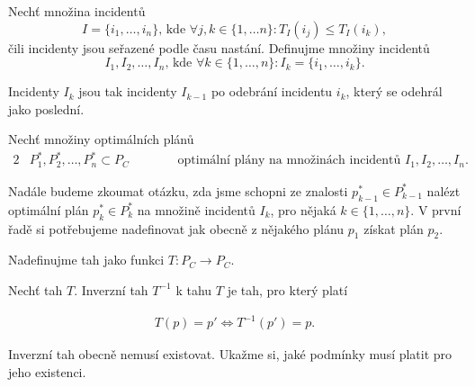 \begin{definice}\label{df:INC}
  Nechť množina incidentů 
  \begin{equation*}
    I = \{ i_1, \dots , i_n \} \text{, kde } \forall j, k \in \{ 1, \dots n\} \colon T_I(i_j) \leq T_I(i_k),
  \end{equation*}
  čili incidenty jsou seřazené podle času nastání.
  Definujme množiny incidentů
  \begin{equation*}
    I_1, I_2, \dots, I_n \text{, kde } \forall k \in \{ 1, \dots, n \} \colon I_k = \{ i_1, \dots, i_k \}.
  \end{equation*}

  Incidenty $I_k$ jsou tak incidenty $I_{k-1}$ po odebrání incidentu $i_k$, který se odehrál jako poslední.
\end{definice}

\begin{definice}
  Nechť množiny optimálních plánů
  \begin{alignat}{2}
    & P^*_{1}, P^*_2, \dots, P^*_{n} \subset P_C \quad && \hspace{15pt} \text{optimální plány na množinách incidentů $I_{1}, I_2, \dots, I_n$.}
  \end{alignat}
\end{definice}

Nadále budeme zkoumat otázku, zda jsme schopni ze znalosti $p^*_{k-1} \in P^*_{k-1}$ nalézt optimální plán $p^*_k \in P^*_k$ na množině incidentů $I_k$, pro nějaká $k \in \{ 1, \dots, n \}$.
V první řadě si potřebujeme nadefinovat jak obecně z nějakého plánu $p_1$ získat plán $p_2$. 
\begin{definice}[Tah]\label{df:tah}
  Nadefinujme tah jako funkci $T \colon P_C \rightarrow P_C$.
\end{definice}

\begin{definice}\label{df:tah}
  Nechť tah $T$. Inverzní tah $T^{-1}$ k tahu $T$ je tah, pro který platí

  \begin{align*}
    T(p) = p' \Leftrightarrow T^{-1}(p') = p.
  \end{align*}
\end{definice}

Inverzní tah obecně nemusí existovat. Ukažme si, jaké podmínky musí platit pro jeho existenci.


